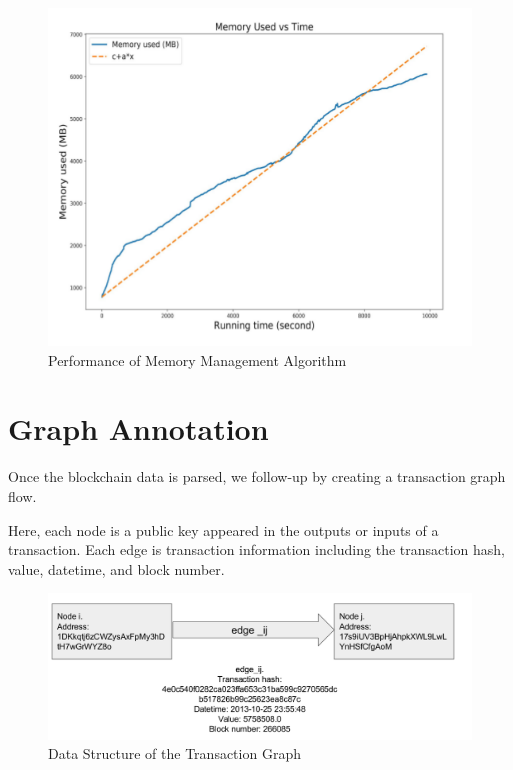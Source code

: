 \documentclass[runningheads,a4paper]{llncs}[2017/09/04]
\begin{document}
\begin{figure}[!htb]
	\centering 
	\includegraphics[width=0.8\columnwidth]{size} 
	\caption{Performance of Memory Management Algorithm} %
	\label{size}
\end{figure}


\section{Graph Annotation}

Once the blockchain data is parsed, we follow-up by creating a transaction graph flow.

Here, each node is a public key appeared in the outputs or inputs of a transaction.
Each edge is transaction information including the transaction hash, value, datetime, and block number.

\begin{figure}[!htb]
	\centering 
	\includegraphics[width=0.8\columnwidth]{graph} 
	\caption{Data Structure of the Transaction Graph} %
	\label{graph}
\end{figure}
\end{document}

